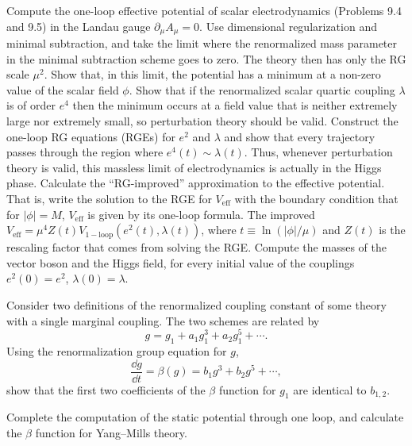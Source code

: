 \begin{banksproblems}
Compute the one-loop effective potential of scalar electrodynamics (Problems
9.4 and 9.5) in the Landau gauge $\partial_\mu A_\mu=0$. Use dimensional
regularization and minimal subtraction, and take the limit where the
renormalized mass parameter in the minimal subtraction scheme goes to zero. The
theory then has only the RG scale $\mu^2$. Show that, in this limit, the
potential has a minimum at a non-zero value of the scalar field $\phi$. Show
that if the renormalized scalar quartic coupling $\lambda$ is of order $e^4$
then the minimum occurs at a field value that is neither extremely large nor
extremely small, so perturbation theory should be valid. Construct the one-loop
RG equations (RGEs) for $e^2$ and $\lambda$ and show that every trajectory
passes through the region where $e^4(t)\sim\lambda(t)$. Thus, whenever
perturbation theory is valid, this massless limit of electrodynamics is actually
in the Higgs phase. Calculate the ``RG-improved'' approximation to the
effective potential. That is, write the solution to the RGE for $V_{\mathrm{eff}}$
with the boundary condition that for $|\phi|=M$, $V_{\mathrm{eff}}$ is given by
its one-loop formula. The improved
$V_{\mathrm{eff}}=\mu^4Z(t)V_{\mathrm{1-loop}}(e^2(t),\lambda(t))$, where
$t\equiv\ln(|\phi|/\mu)$ and $Z(t)$ is the rescaling factor that comes from
solving the RGE. Compute the masses of the vector boson and the Higgs field,
for every initial value of the couplings $e^2(0)=e^2$, $\lambda(0)=\lambda$.

Consider two definitions of the renormalized coupling constant of some theory
with a single marginal coupling. The two schemes are related by
\[
  g=g_1+a_1g_1^3+a_2g_1^5+\cdots.
\]
Using the renormalization group equation for $g$,
\[
  \frac{\dd g}{\dd t}=\beta(g)=b_1g^3+b_2g^5+\cdots,
\]
show that the first two coefficients of the $\beta$ function for $g_1$ are
identical to $b_{1,2}$.

Complete the computation of the static potential through one loop, and
calculate the $\beta$ function for Yang--Mills theory.

\end{banksproblems}
